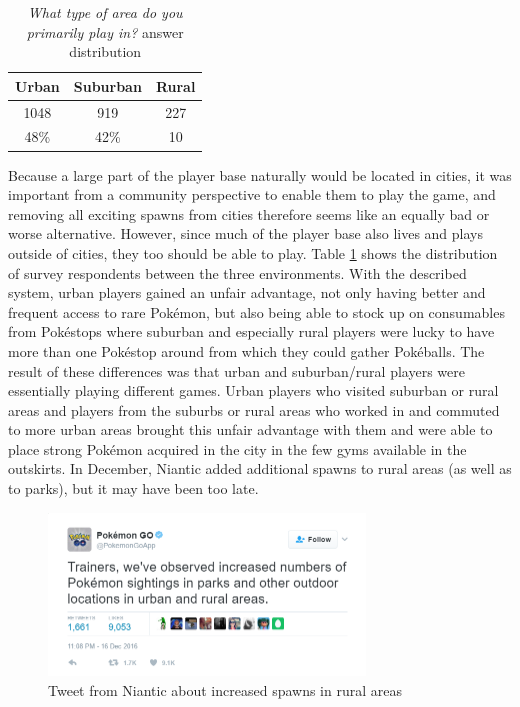 \begin{table}[h]
	\centering
	\caption{\emph{What type of area do you primarily play in?} answer distribution}
	\label{tbl:urban-level-distribution}
	\begin{tabular}{|c|c|c|}
		\hline
		\textbf{Urban} & \textbf{Suburban} & \textbf{Rural}\\
		\hline\hline
		1048	& 919	& 227\\
		48\%	& 42\%	& 10\\\hline
	\end{tabular}
\end{table}

Because a large part of the player base naturally would be located in cities, it was important from a community perspective to enable them to play the game, and removing all exciting spawns from cities therefore seems like an equally bad or worse alternative. However, since much of the player base also lives and plays outside of cities, they too should be able to play. Table \ref{tbl:urban-level-distribution} shows the distribution of survey respondents between the three environments. With the described system, urban players gained an unfair advantage, not only having better and frequent access to rare Pokémon, but also being able to stock up on consumables from Pokéstops where suburban and especially rural players were lucky to have more than one Pokéstop around from which they could gather Pokéballs. The result of these differences was that urban and suburban/rural players were essentially playing different games. Urban players who visited suburban or rural areas and players from the suburbs or rural areas who worked in and commuted to more urban areas brought this unfair advantage with them and were able to place strong Pokémon acquired in the city in the few gyms available in the outskirts. In December, Niantic added additional spawns to rural areas (as well as to parks), but it may have been too late.

\begin{figure}[h]
	\centering
	\includegraphics[width=0.75\textwidth]{Figures/pogo-rural-spawns-increase}
	\caption{Tweet from Niantic about increased spawns in rural areas}
\end{figure}

